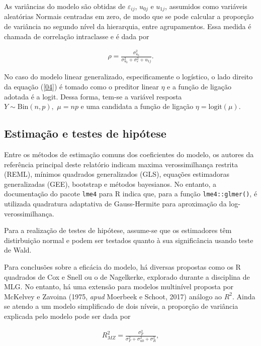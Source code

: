 \documentclass[
  letterpaper,
  DIV=11,
  numbers=noendperiod]{scrartcl}
\begin{document}
As variâncias do modelo são obtidas de \(\varepsilon_{ij}\), \(u_{0j}\)
e \(u_{1j}\), assumidos como variáveis aleatórias Normais centradas em
zero, de modo que se pode calcular a proporção de variância no segundo
nível da hierarquia, entre agrupamentos. Essa medida é chamada de
correlação intraclasse e é dada por

\begin{align}
  \rho = \frac{\sigma^2_{u_0}}{\sigma^2_{u_0}+\sigma^2_{\varepsilon}+u_{1j}}.
\end{align}

No caso do modelo linear generalizado, especificamente o logístico, o
lado direito da equação (\ref{04}) é tomado como o preditor linear
\(\eta\) e a função de ligação adotada é a logit. Dessa forma, tem-se a
variável resposta \(Y\sim \text{Bin}(n,p), \,\, \mu = np\) e uma
candidata a função de ligação \(\eta = \text{logit}(\mu)\).

\hypertarget{estimauxe7uxe3o-e-testes-de-hipuxf3tese}{%
\subsection{Estimação e testes de
hipótese}\label{estimauxe7uxe3o-e-testes-de-hipuxf3tese}}

Entre os métodos de estimação comuns dos coeficientes do modelo, os
autores da referência principal deste relatório indicam maxima
verossimilhança restrita (REML), mínimos quadrados generalizados (GLS),
equações estimadoras generalizadas (GEE), bootstrap e métodos
bayesianos. No entanto, a documentação do pacote \texttt{lme4} para R
indica que, para a função \texttt{lme4::glmer()}, é utilizada quadratura
adaptativa de Gauss-Hermite para aproximação da log-verossimilhança.

Para a realização de testes de hipótese, assume-se que os estimadores
têm distirbuição normal e podem ser testados quanto à sua significância
usando teste de Wald.

Para conclusões sobre a eficácia do modelo, há diversas propostas como
os R quadrados de Cox e Snell ou o de Nagelkerke, explorado durante a
disciplina de MLG. No entanto, há uma extensão para modelos multinível
proposta por McKelvey e Zavoina (1975, \emph{apud} Moerbeek e Schoot,
2017) análogo ao \(R^2\). Ainda se atendo a um modelo simplificado de
dois níveis, a proporção de variância explicada pelo modelo pode ser
dada por

\begin{align}
    R^2_{MZ} = \frac{\sigma^2_{F}}{\sigma^2_{F}+\sigma^2_{u0}+\sigma^2_{R}},
\end{align}
\end{document}
